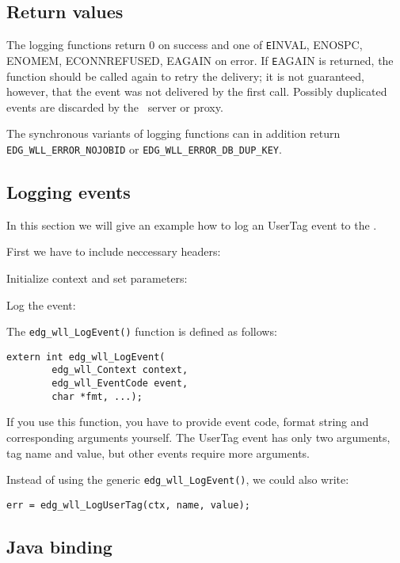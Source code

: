 \subsection{Return values}
The logging functions return 0 on success and one of {\texttt EINVAL,
ENOSPC, ENOMEM, ECONNREFUSED, EAGAIN} on error. If {\texttt EAGAIN} is
returned, the function should be called again to retry the delivery;
it is not guaranteed, however, that the event was not delivered by the
first call. Possibly duplicated events are discarded by the \LB\
server or proxy.

The synchronous variants of logging functions can in addition return
\verb'EDG_WLL_ERROR_NOJOBID' or \verb'EDG_WLL_ERROR_DB_DUP_KEY'.

\subsection{Logging events}
In this section we will give an example how to log an UserTag event to
the \LB.

First we have to include neccessary headers:


Initialize context and set parameters:




Log the event:


The \verb'edg_wll_LogEvent()' function is defined as follows:
\begin{lstlisting}[numbers=none]
extern int edg_wll_LogEvent(
        edg_wll_Context context,
        edg_wll_EventCode event,
        char *fmt, ...);
\end{lstlisting}
If you use this function, you have to provide event code, format
string and corresponding arguments yourself. The UserTag event has
only two arguments, tag name and value, but other events require more
arguments. 

Instead of using the generic \verb'edg_wll_LogEvent()', we could also
write:
\begin{lstlisting}[firstnumber=92]
err = edg_wll_LogUserTag(ctx, name, value);
\end{lstlisting}

\subsection{Java binding}
